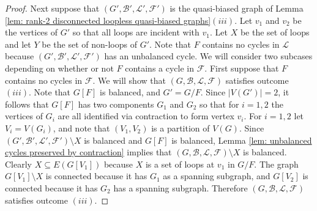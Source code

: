 \documentclass[12pt]{article}
\theoremstyle{definition}
\theoremstyle{plain} %
\newcommand{\cB}{\mathcal{B}}
\newcommand{\cF}{\mathcal{F}}
\newcommand{\cL}{\mathcal{L}}
\newcommand{\del}{\!\setminus\!}
\begin{document}
\begin{proof}
Next suppose that $(G', \cB', \cL', \cF')$ is the quasi-biased graph of Lemma \ref{lem: rank-2 disconnected loopless quasi-biased graphs}$(iii)$. 
Let $v_1$ and $v_2$ be the vertices of $G'$ so that all loops are incident with $v_1$.
Let $X$ be the set of loops and let $Y$ be the set of non-loops of $G'$.
Note that $F$ contains no cycles in $\cL$ because $(G', \cB', \cL', \cF')$ has an unbalanced cycle.
We will consider two subcases depending on whether or not $F$ contains a cycle in $\cF$.
First suppose that $F$ contains no cycles in $\cF$.
We will show that $(G, \cB, \cL, \cF)$ satisfies outcome $(iii)$.
Note that $G[F]$ is balanced, and $G' = G/F$.
Since $|V(G')| = 2$, it follows that $G[F]$ has two components $G_1$ and $G_2$ so that for $i = 1,2$ the vertices of $G_i$ are all identified via contraction to form vertex $v_i$.
For $i = 1,2$ let $V_i = V(G_i)$, and note that $(V_1, V_2)$ is a partition of $V(G)$.
Since $(G', \cB', \cL', \cF') \del X$ is balanced and $G[F]$ is balanced, Lemma \ref{lem: unbalanced cycles preserved by contraction} implies that $(G, \cB, \cL, \cF) \del X$ is balanced.
Clearly $X \subseteq E(G[V_1])$ because $X$ is a set of loops at $v_1$ in $G/F$.
The graph $G[V_1]\del X$ is connected because it has $G_1$ as a spanning subgraph, and $G[V_2]$ is connected because it has $G_2$ has a spanning subgraph.
Therefore $(G, \cB, \cL, \cF)$ satisfies outcome $(iii)$.


\end{proof}
\end{document}
